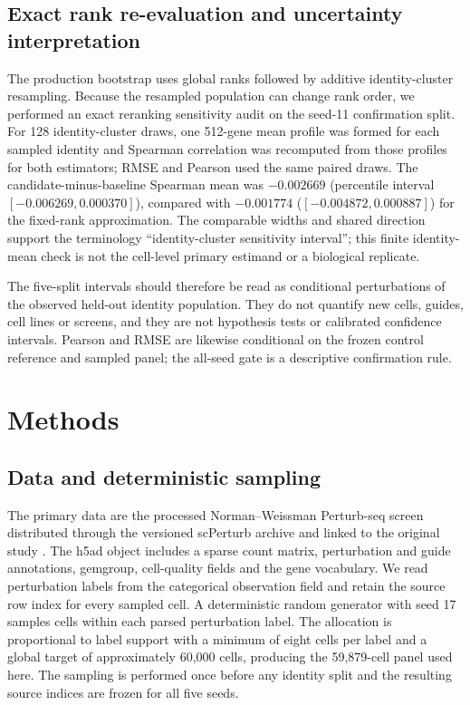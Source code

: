 \documentclass[10pt]{article}
\begin{document}
\subsection{Exact rank re-evaluation and uncertainty interpretation}
The production bootstrap uses global ranks followed by additive identity-cluster resampling. Because the resampled population can change rank order, we performed an exact reranking sensitivity audit on the seed-11 confirmation split. For 128 identity-cluster draws, one 512-gene mean profile was formed for each sampled identity and Spearman correlation was recomputed from those profiles for both estimators; RMSE and Pearson used the same paired draws. The candidate-minus-baseline Spearman mean was $-0.002669$ (percentile interval $[-0.006269,0.000370]$), compared with $-0.001774$ ($[-0.004872,0.000887]$) for the fixed-rank approximation. The comparable widths and shared direction support the terminology ``identity-cluster sensitivity interval''; this finite identity-mean check is not the cell-level primary estimand or a biological replicate.

The five-split intervals should therefore be read as conditional perturbations of the observed held-out identity population. They do not quantify new cells, guides, cell lines or screens, and they are not hypothesis tests or calibrated confidence intervals. Pearson and RMSE are likewise conditional on the frozen control reference and sampled panel; the all-seed gate is a descriptive confirmation rule.

\section{Methods}
\subsection{Data and deterministic sampling}
The primary data are the processed Norman--Weissman Perturb-seq screen distributed through the versioned scPerturb archive and linked to the original study \citep{pmid31395745}. The h5ad object includes a sparse count matrix, perturbation and guide annotations, gemgroup, cell-quality fields and the gene vocabulary. We read perturbation labels from the categorical observation field and retain the source row index for every sampled cell. A deterministic random generator with seed 17 samples cells within each parsed perturbation label. The allocation is proportional to label support with a minimum of eight cells per label and a global target of approximately 60,000 cells, producing the 59,879-cell panel used here. The sampling is performed once before any identity split and the resulting source indices are frozen for all five seeds.
\end{document}
